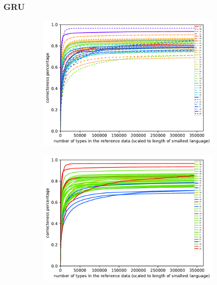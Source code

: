 \documentclass[11pt,a4paper,twoside,openright]{scrbook}
\begin{document}
\subsubsection{GRU}

\begin{figure}[h]
    \centering
    \begin{subfigure}[b]{0.32\textwidth}
    	\centering
        \includegraphics[width=\textwidth]{graphs/gru/norm_huge_type_token_performance}
    \end{subfigure}
    \begin{subfigure}[b]{0.32\textwidth}
    	\centering
        \includegraphics[width=\textwidth]{graphs/gru/morph_types/norm_huge_type_token_performance}
    \end{subfigure}

\end{figure}
\end{document}
